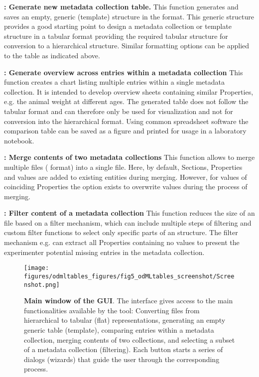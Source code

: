 \textbf{\fgenerate: Generate new metadata collection table.} This function generates and saves an empty, generic (template)  structure in the  format. This generic structure provides a good starting point to design a metadata collection or template structure in a tabular format providing the required tabular structure for conversion to a hierarchical  structure. Similar formatting options can be applied to the table as indicated above.

\textbf{\fcompare: Generate overview across entries within a metadata collection} This function creates a chart listing multiple entries within a single metadata collection. It is intended to develop overview sheets containing similar Properties, e.g. the animal weight at different ages. The generated table does not follow the tabular  format and can therefore only be used for visualization and not for conversion into the hierarchical  format. Using common spreadsheet software the comparison table can be saved as a figure and printed for usage in a laboratory notebook.

\textbf{\fmerge: Merge contents of two metadata collections} This function allows to merge multiple files ( format) into a single file. Here, by default, Sections, Properties and values are added to existing entities during merging. However, for values of coinciding Properties the option exists to overwrite values during the process of merging.

\textbf{\ffilter: Filter content of a metadata collection} This function reduces the size of an  file based on a filter mechanism, which can include multiple steps of filtering and custom filter functions to select only specific parts of an  structure. The filter mechanism e.g. can extract all Properties containing no values to present the experimenter potential missing entries in the metadata collection.


\begin{figure}[!ht]
\begin{center}
\texttt{[image: figures/odmltables\_figures/fig5\_odMLtables\_screenshot/Screenshot.png]}
\caption[Main window of the  GUI]{{\label{fig:GUI_mainwindow}
\textbf{Main window of the  GUI}. The interface gives access to the main functionalities available by the tool: Converting files from hierarchical to tabular (flat) representations, generating an empty generic  table (template), comparing entries within a metadata collection, merging contents of two collections, and selecting a subset of a metadata collection (filtering). Each button starts a series of dialogs (wizards) that guide the user through the corresponding process.
}}
\end{center}
\end{figure}

